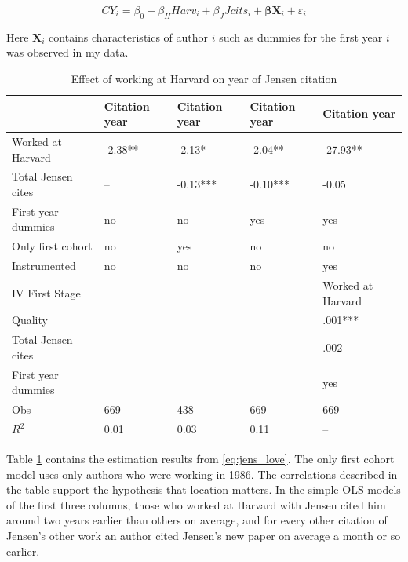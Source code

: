 \begin{equation}
    CY_i = \beta_0 + \beta_H Harv_i + \beta_J Jcits_i + \mathbf{\beta} \mathbf{X}_i + \varepsilon_i
    \label{eq:jens_love}
\end{equation}

Here $\mathbf{X}_i$ contains characteristics of author $i$ such as dummies for
the first year $i$ was observed in my data.  


\begin{table}[h!]
    \begin{tabular}{|l|llll|}
        \hline
                           & Citation year & Citation year & Citation year & Citation year \\ \hline
        Worked at Harvard  & -2.38**       & -2.13*        & -2.04**       & -27.93**      \\
        Total Jensen cites & --            & -0.13***      & -0.10***      & -0.05         \\
        First year dummies & no            & no            & yes           & yes           \\
        Only first cohort  & no            & yes           & no            & no            \\
        Instrumented       & no            & no            & no            & yes           \\ \hline \hline
        IV First Stage     &               &               &               & Worked at Harvard \\ \hline
        Quality            &               &               &               & .001***       \\
        Total Jensen cites &               &               &               & .002          \\
        First year dummies &               &               &               & yes           \\ \hline
        Obs                & 669           & 438           & 669           & 669           \\
        $R^2$              & 0.01          & 0.03          & 0.11          & --            \\ \hline \hline

    \end{tabular}
    \caption{Effect of working at Harvard on year of Jensen citation}
    \label{tab:jens_love}
\end{table}

Table \ref{tab:jens_love} contains the estimation results from \eqref{eq:jens_love}.
The only first cohort model uses only authors who were working in 1986.  The
correlations described in the table support the hypothesis that location matters.
In the simple OLS models of the first three columns, those who worked at
Harvard with Jensen cited him around two years earlier than others on
average, and for every other citation of Jensen's other work an author
cited Jensen's new paper on average a month or so earlier.

